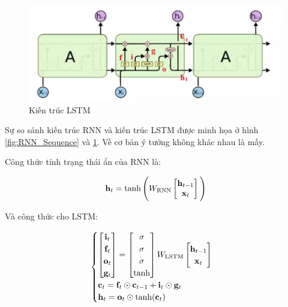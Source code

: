 \documentclass[14pt, a4paper]{article}
\numberwithin{equation}{section}
\numberwithin{algorithm}{section}
\numberwithin{figure}{section}
\numberwithin{dl}{section}
\numberwithin{md}{section}
\numberwithin{bd}{section}
\numberwithin{dn}{section}
\numberwithin{hq}{section}
\begin{document}
    \begin{figure}[h!] \centering

        \includegraphics[scale=0.8]{LSTM_Sequence.jpg}
        \caption{Kiến trúc LSTM}
    
        \label{fig:LSTM_Sequence}
    \end{figure}

    Sự so sánh kiến trúc RNN và kiến trúc LSTM được minh họa ở hình \ref{fig:RNN_Sequence} và \ref{fig:LSTM_Sequence}.
    Về cơ bản ý tưởng không khác nhau là mấy.

    Công thức tính trạng thái ẩn của RNN là:

    \begin{equation}
        \bold{h}_t = \tanh \Bigg( W_{\mathrm{RNN}} \begin{bmatrix} \bold{h}_{t-1} \\ \bold{x}_t \end{bmatrix} \Bigg)
    \end{equation}

    Và công thức cho LSTM:

    \begin{equation}
        \begin{cases}
            \begin{bmatrix}
                \bold{i}_t \\
                \bold{f}_t \\
                \bold{o}_t \\
                \bold{g}_t
            \end{bmatrix}=\begin{bmatrix}
                \sigma \\
                \sigma \\
                \sigma \\
                \mathrm{tanh}
            \end{bmatrix}W_{\mathrm{LSTM}}\begin{bmatrix}
                \bold{h}_{t-1} \\
                \bold{x}_t
            \end{bmatrix} \\
            \bold{c}_t = \bold{f}_t \odot\bold{c}_{t-1} + \bold{i}_t \odot \bold{g}_t \\
            \bold{h}_t = \bold{o}_t \odot \mathrm{tanh}(\bold{c}_t)
        \end{cases}
    \end{equation}
\end{document}
